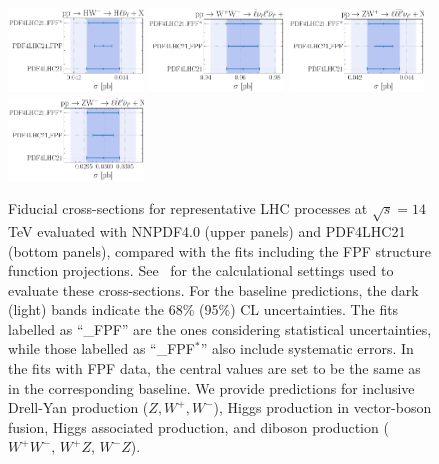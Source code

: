 \begin{figure}[htbp]
\includegraphics[width=0.32\textwidth]{plots/LHCpheno/NNPDF_HWM_14TEV_40_PHENO-integrated-pdf4lhc21.pdf}
\includegraphics[width=0.32\textwidth]{plots/LHCpheno/NNPDF_WPWM_14TEV_40_PHENO-integrated-pdf4lhc21.pdf}
\includegraphics[width=0.32\textwidth]{plots/LHCpheno/NNPDF_WPZ_14TEV_40_PHENO-integrated-pdf4lhc21.pdf}
\includegraphics[width=0.32\textwidth]{plots/LHCpheno/NNPDF_WMZ_14TEV_40_PHENO-integrated-pdf4lhc21.pdf}
\caption{Fiducial cross-sections for representative LHC processes at $\sqrt{s}=14$ TeV
  evaluated with NNPDF4.0 (upper panels) and PDF4LHC21 (bottom panels),
  compared with the fits including the FPF structure function projections.
  See~\cite{NNPDF:2021njg,PDF4LHCWorkingGroup:2022cjn} for the calculational settings
  used to evaluate these cross-sections.
%
For the baseline
predictions, the dark (light) bands indicate the 68\% (95\%) CL uncertainties.
%
The fits labelled as ``\_FPF'' are the ones considering statistical uncertainties,
while those labelled as ``\_FPF$^*$'' also include systematic errors.
%
In the fits with FPF data, the central values are set to be the same as
in the corresponding baseline.
%
We provide predictions for inclusive Drell-Yan production ($Z, W^+, W^-$), Higgs production
in vector-boson fusion, Higgs associated
production, and diboson production ($W^+W^-$, $W^+Z$, $W^-Z$).
%
}
\label{fig:NNPDF40_pheno_integrated}
\end{figure}

